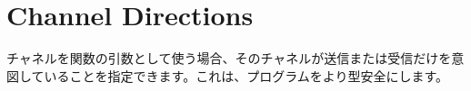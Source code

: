 \section{Channel Directions}

チャネルを関数の引数として使う場合、そのチャネルが送信または受信だけを意図していることを指定できます。これは、プログラムをより型安全にします。




